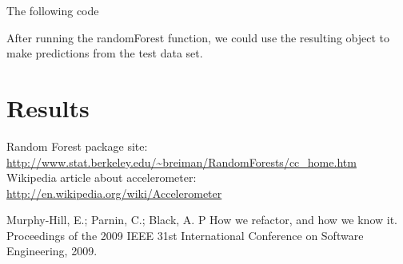 \documentclass[IEEEtran]{IEEEtran}
\begin{document}
The following code 



After running the randomForest function, we could use the resulting object to
make predictions from the test data set. 


\section{Results}








\begin{thebibliography}{24}

 Random Forest package site: \url{http://www.stat.berkeley.edu/~breiman/RandomForests/cc_home.htm}
 Wikipedia article about accelerometer: \url{http://en.wikipedia.org/wiki/Accelerometer}

 Murphy-Hill, E.; Parnin, C.; Black, A. P  How we refactor, and how we know it. 
Proceedings of the 2009 IEEE 31st International Conference on Software Engineering, 2009.

\end{thebibliography}

\end{document}
